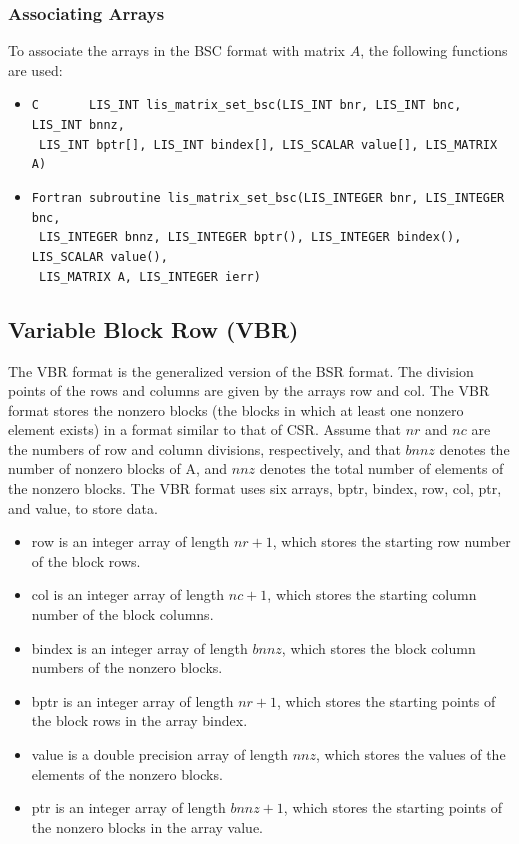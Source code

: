 \documentclass[a4paper]{article}
\begin{document}
\subsubsection{Associating Arrays}
To associate the arrays in the BSC format with matrix $A$, the following functions are used:
\begin{itemize}
\item \verb|C       LIS_INT lis_matrix_set_bsc(LIS_INT bnr, LIS_INT bnc, LIS_INT bnnz,|\\
      \verb| LIS_INT bptr[], LIS_INT bindex[], LIS_SCALAR value[], LIS_MATRIX A)|
\item \verb|Fortran subroutine lis_matrix_set_bsc(LIS_INTEGER bnr, LIS_INTEGER bnc,|\\
      \verb| LIS_INTEGER bnnz, LIS_INTEGER bptr(), LIS_INTEGER bindex(), LIS_SCALAR value(),|\\
      \verb| LIS_MATRIX A, LIS_INTEGER ierr)|
\end{itemize}

\newpage
\subsection{Variable Block Row (VBR)}
The VBR format is the generalized version of the BSR format. The division points of the rows and columns are given by the arrays {\ttfamily row} and {\ttfamily col}. 
The VBR format stores the nonzero blocks (the blocks in which at least
one nonzero element exists) in a format similar to that of CSR. 
Assume that $nr$ and $nc$ are the numbers of row and column divisions, respectively, 
and that $bnnz$ denotes the number of nonzero blocks of A, 
and $nnz$ denotes the total number of elements of the nonzero blocks. 
The VBR format uses six arrays, {\ttfamily bptr}, {\ttfamily bindex}, {\ttfamily
row}, {\ttfamily col}, {\ttfamily ptr}, and {\ttfamily value}, to store data.
\begin{itemize}
\item {\ttfamily row} is an integer array of length $nr+1$, which
      stores the starting row number of the block rows.
\item {\ttfamily col} is an integer array of length $nc+1$, which
      stores the starting column number of the block columns.
\item {\ttfamily bindex} is an integer array of length $bnnz$,
      which stores the block column numbers of the nonzero blocks.
\item {\ttfamily bptr} is an integer array of length $nr+1$,
      which stores the starting points of the block rows in the array {\ttfamily bindex}.
\item {\ttfamily value} is a double precision array of length
      $nnz$, which stores the values of the elements of the nonzero blocks.
\item {\ttfamily ptr} is an integer array of length $bnnz+1$,
      which stores the starting points of the nonzero blocks in the
      array {\ttfamily value}.
\end{itemize}
\end{document}
